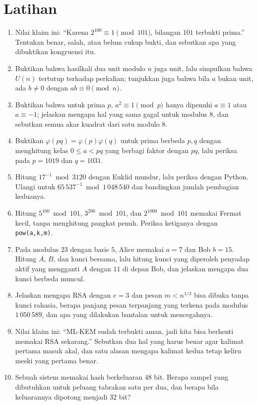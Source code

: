 \section{Latihan}
\begin{latihan}
\begin{enumerate}
  \item Nilai klaim ini: ``Karena $2^{100}\equiv1\pmod{101}$, bilangan $101$ terbukti prima.''
        Tentukan benar, salah, atau belum cukup bukti, dan sebutkan apa yang dibuktikan
        kongruensi itu.
  \item Buktikan bahwa hasilkali dua unit modulo $n$ juga unit, lalu simpulkan bahwa $U(n)$
        tertutup terhadap perkalian; tunjukkan juga bahwa bila $a$ bukan unit, ada $b\neq0$
        dengan $ab\equiv0\pmod n$.
  \item Buktikan bahwa untuk prima $p$, $a^2\equiv1\pmod p$ hanya dipenuhi $a\equiv1$ atau
        $a\equiv-1$; jelaskan mengapa hal yang sama gagal untuk modulus $8$, dan sebutkan
        semua akar kuadrat dari satu modulo $8$.
  \item Buktikan $\varphi(pq)=\varphi(p)\varphi(q)$ untuk prima berbeda $p,q$ dengan menghitung
        kelas $0\le a<pq$ yang berbagi faktor dengan $pq$, lalu periksa pada $p=1019$ dan
        $q=1031$.
  \item Hitung $17^{-1}\bmod3120$ dengan Euklid mundur, lalu periksa dengan Python. Ulangi
        untuk $65\,537^{-1}\bmod1\,048\,540$ dan bandingkan jumlah pembagian keduanya.
  \item Hitung $5^{100}\bmod101$, $3^{200}\bmod101$, dan $2^{1000}\bmod101$ memakai Fermat
        kecil, tanpa menghitung pangkat penuh. Periksa ketiganya dengan \texttt{pow(a,k,m)}.
  \item Pada modulus $23$ dengan basis $5$, Alice memakai $a=7$ dan Bob $b=15$. Hitung $A$,
        $B$, dan kunci bersama, lalu hitung kunci yang diperoleh penyadap aktif yang mengganti
        $A$ dengan $11$ di depan Bob, dan jelaskan mengapa dua kunci berbeda muncul.
  \item Jelaskan mengapa RSA dengan $e=3$ dan pesan $m<n^{1/3}$ bisa dibuka tanpa kunci rahasia,
        berapa panjang pesan terpanjang yang terkena pada modulus $1\,050\,589$, dan apa yang
        dilakukan bantalan untuk mencegahnya.
  \item Nilai klaim ini: ``ML-KEM sudah terbukti aman, jadi kita bisa berhenti memakai RSA
        sekarang.'' Sebutkan dua hal yang harus benar agar kalimat pertama masuk akal, dan satu
        alasan mengapa kalimat kedua tetap keliru meski yang pertama benar.
  \item Sebuah sistem memakai hash berkeluaran $48$ bit. Berapa sampel yang dibutuhkan untuk
        peluang tabrakan satu per dua, dan berapa bila keluarannya dipotong menjadi $32$ bit?
\end{enumerate}


\end{latihan}
